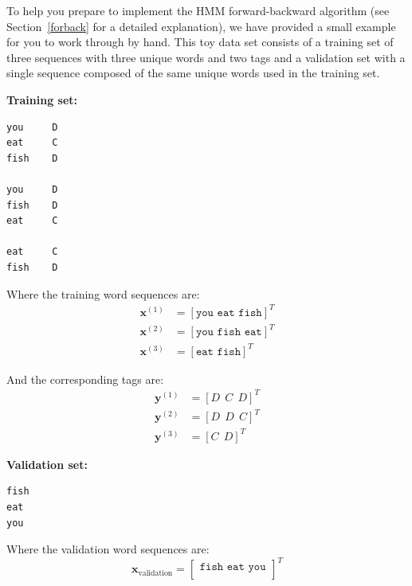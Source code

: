 \documentclass[11pt,addpoints,answers]{exam}
\begin{document}
\begin{questions}  \label{hmm-problem}
\question[14] To help you prepare to implement the HMM forward-backward algorithm (see Section~\ref{forback} for a detailed explanation), we have provided a small example for you to work through by hand. This toy data set consists of a training set of three sequences with three unique words and two tags and a validation set with a single sequence composed of the same unique words used in the training set. 

\textbf{Training set:} 
\begin{verbatim}
you     D
eat     C
fish    D

you     D
fish    D
eat     C

eat     C
fish    D
\end{verbatim}

Where the training word sequences are:
\begin{align*}
    \mathbf{x}^{(1)} &= [\texttt{you eat fish}]^T \\
    \mathbf{x}^{(2)} &= [\texttt{you fish eat}]^T \\
    \mathbf{x}^{(3)} &= [\texttt{eat fish}]^T 
\end{align*}

And the corresponding tags are:
\begin{align*}
    \mathbf{y}^{(1)} &= [D~~C~~D]^T \\
    \mathbf{y}^{(2)} &= [D~~D~~C]^T \\
    \mathbf{y}^{(3)} &= [C~~D]^T
\end{align*}

\textbf{Validation set:}
\begin{verbatim}
fish
eat
you
\end{verbatim}

Where the validation word sequences are: 
$$
\mathbf{x}_{\text{validation}}= 
\begin{bmatrix}
\texttt{fish eat you}\\
\end{bmatrix}^T
$$


\end{questions}
\end{document}
